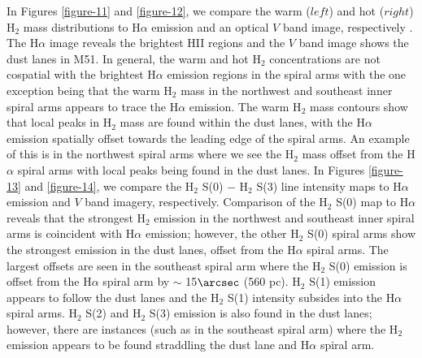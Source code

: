 \documentclass[12pt,preprint]{aastex}
\begin{document}
In Figures \ref{figure-11} and \ref{figure-12}, we compare the warm ($left$) and hot ($right$)
H$_2$ mass distributions to H$\alpha$ emission and an optical $V$ 
band image, respectively .  The H$\alpha$ image reveals the 
brightest HII regions and the $V$ band image shows 
the dust lanes in M51.  In general,
the warm and hot H$_2$ concentrations are not cospatial with
the brightest H$\alpha$ emission regions in the spiral arms with the one
exception being that the warm H$_2$ mass in 
the northwest and southeast inner spiral
arms appears to trace the H$\alpha$ emission.  The warm H$_2$
mass contours show that local peaks in H$_2$ mass are found
within the dust lanes, with the H$\alpha$ emission spatially 
offset towards the leading edge of the spiral arms.  
An example of this is in the northwest spiral
arms where we see the H$_2$ mass offset from the H$\alpha$
spiral arms with local peaks being found in the dust lanes.
In Figures \ref{figure-13} and \ref{figure-14}, we compare the H$_2$ S(0) $-$
H$_2$ S(3) line intensity maps to H$\alpha$ emission and $V$ band imagery, respectively.
Comparison of the H$_2$ S(0) map to H$\alpha$ reveals that
the strongest H$_2$ emission in the northwest and southeast
inner spiral arms is coincident with H$\alpha$ emission; however, the
other H$_2$ S(0) spiral arms show the strongest emission in
the dust lanes, offset from the H$\alpha$ spiral arms.  The largest
offsets are seen in the southeast spiral arm where the H$_2$
S(0) emission is offset from the H$\alpha$ spiral arm by $\sim$
15$\arcsec$ (560 pc).  H$_2$ S(1) emission appears to follow
the dust lanes and the H$_2$ S(1) intensity subsides into the
H$\alpha$ spiral arms.  H$_2$ S(2) and H$_2$ S(3)
emission is also found in the dust lanes; however, there are instances
(such as in the southeast spiral arm) where the H$_2$
emission appears to be found straddling the dust lane and H$\alpha$
spiral arm.
\end{document}
